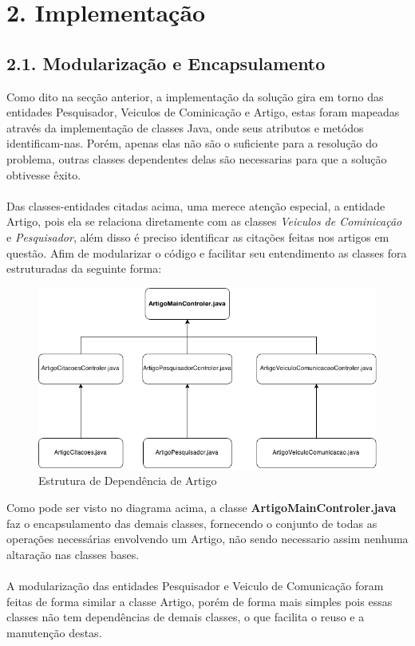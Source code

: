 \documentclass[12pt, a4paper]{article}
\begin{document}
\section*{2. Implementação}
  \subsection*{2.1. Modularização e Encapsulamento}
  Como dito na secção anterior, a implementação da solução gira em torno das entidades Pesquisador, Veiculos de Cominicação e Artigo, estas foram mapeadas através da implementação de classes Java, onde seus atributos e metódos identificam-nas. Porém, apenas elas não são o suficiente para a resolução do problema, outras classes dependentes delas são necessarias para que a solução obtivesse êxito. \\\\
  Das classes-entidades citadas acima, uma merece atenção especial, a entidade Artigo, pois ela se relaciona diretamente com as classes \textit{Veiculos de Cominicação} e \textit{Pesquisador}, além disso é preciso identificar as citações feitas nos artigos em questão. Afim de modularizar o código e facilitar seu entendimento as classes fora estruturadas da seguinte forma:

  \begin{figure}[!htb]
   \centering
    \includegraphics[scale=0.5]{Artigo}
    \caption{Estrutura de Dependência de Artigo}
   \label{Rotulo}
  \end{figure}
  Como pode ser visto no diagrama acima, a classe \textbf{ArtigoMainControler.java} faz o encapsulamento das demais classes, fornecendo o conjunto de todas as operações necessárias envolvendo um Artigo, não sendo necessario assim nenhuma altaração nas classes bases.\\\\
  A modularização das entidades Pesquisador e Veiculo de Comunicação foram feitas de forma similar a classe Artigo, porém de forma mais simples pois essas classes não tem dependências de demais classes, o que facilita o reuso e a manutenção destas.
\end{document}
